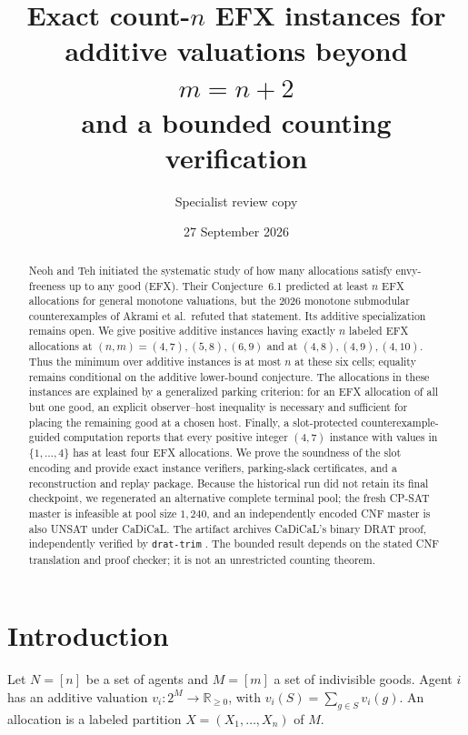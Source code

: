 \documentclass[11pt]{article}
\title{Exact count-\texorpdfstring{$n$}{n} EFX instances for additive valuations beyond
\texorpdfstring{$m=n+2$}{m=n+2}\\and a bounded counting verification}
\author{Specialist review copy}
\date{27 September 2026}
\theoremstyle{plain}
\theoremstyle{definition}
\begin{document}
\maketitle

\begin{abstract}
Neoh and Teh initiated the systematic study of how many allocations satisfy
envy-freeness up to any good (EFX).  Their Conjecture~6.1 predicted at least
$n$ EFX allocations for general monotone valuations, but the 2026 monotone
submodular counterexamples of Akrami et al.\ refuted that statement.  Its additive
specialization remains open.  We give positive additive instances having
exactly $n$ labeled EFX allocations at $(n,m)=(4,7),(5,8),(6,9)$ and at
$(4,8),(4,9),(4,10)$.  Thus the minimum over additive instances is at most
$n$ at these six cells; equality remains conditional on the additive lower-bound
conjecture.  The allocations in these instances
are explained by a generalized parking criterion: for an EFX allocation of all
but one good, an explicit observer--host inequality is necessary and sufficient
for placing the remaining good at a chosen host.  Finally, a slot-protected
counterexample-guided computation reports that every positive integer $(4,7)$
instance with values in $\{1,\ldots,4\}$ has at least four EFX allocations.  We
prove the soundness of the slot encoding and provide exact instance verifiers,
parking-slack certificates, and a reconstruction and replay package.  Because
the historical run did not retain its final checkpoint, we regenerated an
alternative complete terminal pool; the fresh CP-SAT master is infeasible at
pool size $1{,}240$, and an independently encoded CNF master is also UNSAT
under CaDiCaL.  The artifact archives CaDiCaL's binary DRAT proof,
independently verified by \texttt{drat-trim} \cite{DRATtrim}.  The bounded result depends on
the stated CNF translation and proof checker; it is not an unrestricted
counting theorem.
\end{abstract}

\section{Introduction}

Let $N=[n]$ be a set of agents and $M=[m]$ a set of indivisible goods.  Agent
$i$ has an additive valuation $v_i\colon 2^M\to\mathbb{R}_{\ge0}$, with
$v_i(S)=\sum_{g\in S}v_i(g)$.  An allocation is a labeled partition
$X=(X_1,\ldots,X_n)$ of $M$.
\end{document}
